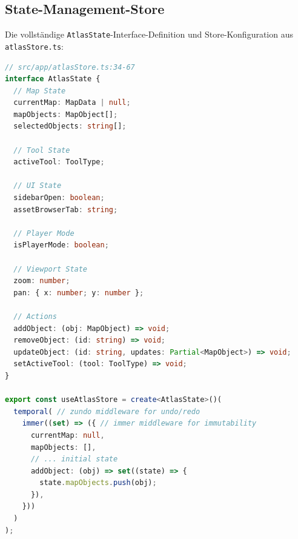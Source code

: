 \subsection{State-Management-Store}
\label{sec:anhang-state-management}

Die vollständige \texttt{AtlasState}-Interface-Definition und Store-Konfiguration aus \texttt{atlasStore.ts}:

\begin{lstlisting}[language=TypeScript,caption={Atlas Store Structure (vollständige Implementierung)},label=lst:atlas-store-full]
// src/app/atlasStore.ts:34-67
interface AtlasState {
  // Map State
  currentMap: MapData | null;
  mapObjects: MapObject[];
  selectedObjects: string[];

  // Tool State
  activeTool: ToolType;

  // UI State
  sidebarOpen: boolean;
  assetBrowserTab: string;

  // Player Mode
  isPlayerMode: boolean;

  // Viewport State
  zoom: number;
  pan: { x: number; y: number };

  // Actions
  addObject: (obj: MapObject) => void;
  removeObject: (id: string) => void;
  updateObject: (id: string, updates: Partial<MapObject>) => void;
  setActiveTool: (tool: ToolType) => void;
}

export const useAtlasStore = create<AtlasState>()(
  temporal( // zundo middleware for undo/redo
    immer((set) => ({ // immer middleware for immutability
      currentMap: null,
      mapObjects: [],
      // ... initial state
      addObject: (obj) => set((state) => {
        state.mapObjects.push(obj);
      }),
    }))
  )
);
\end{lstlisting}
